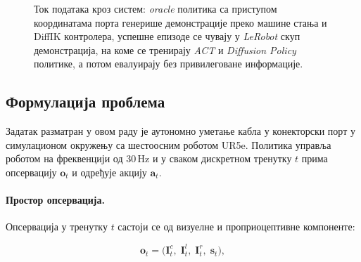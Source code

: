 \documentclass[12pt, a4paper]{article}
\begin{document}
\begin{figure}[htbp]
{%
    }
    \caption[Ток података кроз систем]{Ток података кроз систем: \textit{oracle} политика са приступом координатама порта генерише демонстрације преко машине стања и DiffIK контролера, успешне епизоде се чувају у \textit{LeRobot} скуп демонстрација, на коме се тренирају \textit{ACT} и \textit{Diffusion Policy} политике, а потом евалуирају без привилеговане информације.}
    \label{fig:pipeline}
\end{figure}

\subsection{Формулација проблема}
\label{subsec:formulacija}

Задатак разматран у овом раду је аутономно уметање кабла у конекторски порт у симулационом окружењу са шестоосним роботом UR5e.
Политика управља роботом на фреквенцији од $30$\,Hz и у сваком дискретном тренутку $t$ прима опсервацију $\mathbf{o}_t$ и одређује акцију $\mathbf{a}_t$.

\paragraph{Простор опсервација.}
Опсервација у тренутку $t$ састоји се од визуелне и проприоцептивне компоненте:

\begin{equation}
    \mathbf{o}_t = \bigl(
        \mathbf{I}_t^{c},\;
        \mathbf{I}_t^{l},\;
        \mathbf{I}_t^{r},\;
        \mathbf{s}_t
    \bigr),
    \label{eq:obs_space}
\end{equation}
\end{document}

